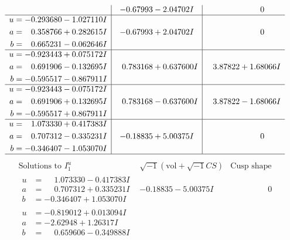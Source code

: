 \documentclass[1p]{elsarticle_modified}
\theoremstyle{definition}
\newcommand{\I}{\sqrt{-1}}
\begin{document}
$$\begin{array}{c|c|c}
 & -0.67993 - 2.04702 I & \phantom{-0.000000 } 0 \\ \hline\begin{aligned}
u &= -0.293680 - 1.027110 I \\
a &= \phantom{-}0.358766 + 0.282615 I \\
b &= \phantom{-}0.665231 - 0.062646 I\end{aligned}
 & -0.67993 + 2.04702 I & \phantom{-0.000000 } 0 \\ \hline\begin{aligned}
u &= -0.923443 + 0.075172 I \\
a &= \phantom{-}0.691906 - 0.132695 I \\
b &= -0.595517 - 0.867911 I\end{aligned}
 & \phantom{-}0.783168 + 0.637600 I & \phantom{-}3.87822 + 1.68066 I \\ \hline\begin{aligned}
u &= -0.923443 - 0.075172 I \\
a &= \phantom{-}0.691906 + 0.132695 I \\
b &= -0.595517 + 0.867911 I\end{aligned}
 & \phantom{-}0.783168 - 0.637600 I & \phantom{-}3.87822 - 1.68066 I \\ \hline\begin{aligned}
u &= \phantom{-}1.073330 + 0.417383 I \\
a &= \phantom{-}0.707312 - 0.335231 I \\
b &= -0.346407 - 1.053070 I\end{aligned}
 & -0.18835 + 5.00375 I & \phantom{-0.000000 } 0\\
 \hline 
 \end{array}$$\newpage$$\begin{array}{c|c|c}  
\text{Solutions to }I^u_{1}& \I (\text{vol} + \sqrt{-1}CS) & \text{Cusp shape}\\
 \hline 
\begin{aligned}
u &= \phantom{-}1.073330 - 0.417383 I \\
a &= \phantom{-}0.707312 + 0.335231 I \\
b &= -0.346407 + 1.053070 I\end{aligned}
 & -0.18835 - 5.00375 I & \phantom{-0.000000 } 0 \\ \hline\begin{aligned}
u &= -0.819012 + 0.013094 I \\
a &= -2.62948 + 1.26317 I \\
b &= \phantom{-}0.659606 - 0.349888 I\end{aligned}

\end{array}$$
\end{document}
